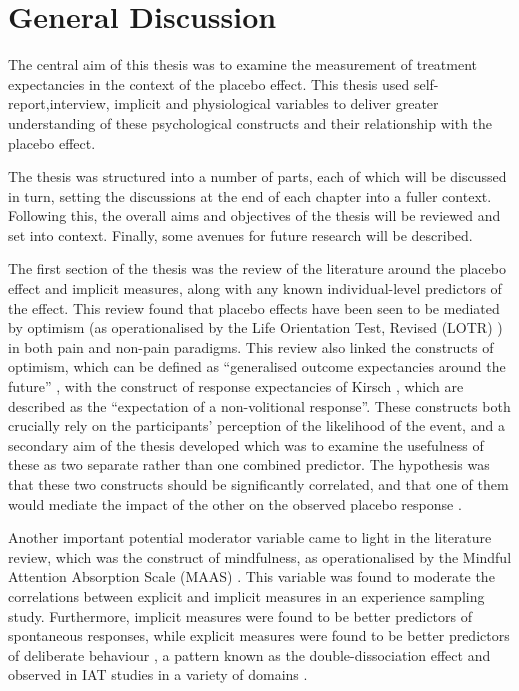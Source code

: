 

\section{General Discussion}

The central aim of this thesis was to examine the measurement of treatment
expectancies in the context of the placebo effect. This thesis used self-report,interview, implicit and physiological variables to deliver greater understanding of these psychological constructs and their relationship with the placebo effect.


The thesis was structured into a number of parts, each of which will be discussed in turn, setting the discussions at the end of each chapter into a fuller context. Following this, the overall aims and objectives of the thesis will be reviewed and set into context. Finally, some avenues for future research will be described. 

The first section of the thesis was the review of the literature around the placebo effect and implicit measures, along with any known individual-level predictors of the effect. This review found that placebo effects have been seen to be mediated by optimism (as operationalised by the Life Orientation Test, Revised (LOTR) \cite{Scheier1994}) \cite{Geers2005,morton2009reproducibility} in both pain and non-pain paradigms. This review also linked the constructs of optimism, which can be defined as ``generalised outcome expectancies around the future'' \cite{Carver2010}, with the construct of response expectancies of Kirsch \cite{Kirsch1985,Kirsch1997}, which are described as the ``expectation of a non-volitional response''. These constructs both crucially rely on the participants' perception of the likelihood of the event, and a secondary aim of the thesis developed which was to examine the usefulness of these as two separate rather than one combined predictor. The hypothesis was that these two constructs should be significantly correlated, and that one of them would mediate the impact of the other on the observed placebo response \cite{Geers2005}. 

Another important potential moderator variable came to light in the literature review, which was the construct of mindfulness, as operationalised by the Mindful Attention Absorption Scale (MAAS) \cite{brown2003benefits}. This variable was found to moderate the correlations between explicit and implicit measures in an experience sampling study. Furthermore, implicit measures were found to be better predictors of spontaneous responses, while explicit measures were found to be better predictors of deliberate behaviour \cite{Levesque2007}, a pattern known as the double-dissociation effect and observed in IAT studies in a variety of domains \cite{Asendorpf2002,Perugini2005,Grumm2007,Steffens2006}. 

